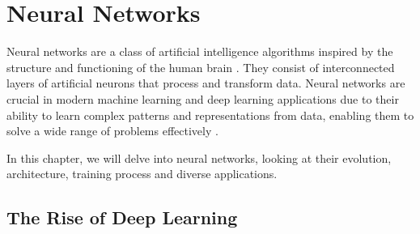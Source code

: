 % 

% 
 
\section{Neural Networks}


Neural networks are a class of artificial intelligence algorithms inspired by the structure and functioning of the human brain \cite{DeepLearningTextBook}. They consist of interconnected layers of artificial neurons that process and transform data. Neural networks are crucial in modern machine learning and deep learning applications due to their ability to learn complex patterns and representations from data, enabling them to solve a wide range of problems effectively \cite{DeepLearningTextBook}.

In this chapter, we will delve into neural networks, looking at their evolution, architecture, training process and diverse applications.
% 

\subsection{The Rise of Deep Learning}

